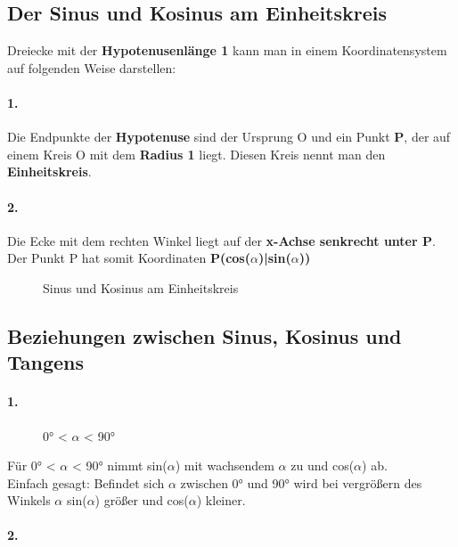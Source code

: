 \documentclass[12pt,a4paper]{article}
\begin{document}
\subsection{Der Sinus und Kosinus am Einheitskreis}
\noindent
Dreiecke mit der \textbf{Hypotenusenlänge 1} kann man in einem Koordinatensystem auf folgenden Weise darstellen:
\begin{multicols}{2}
\paragraph{1. }
Die Endpunkte der \textbf{Hypotenuse} sind der Ursprung O und ein Punkt \textbf{P}, der auf einem Kreis O mit dem \textbf{Radius 1} liegt. Diesen Kreis nennt man den \textbf{Einheitskreis}.
\paragraph{2. }
Die Ecke mit dem rechten Winkel liegt auf der \textbf{x-Achse senkrecht unter P}. Der Punkt P hat somit Koordinaten \textbf{P(cos($\alpha$)|sin($\alpha$))}
\end{multicols}
\begin{figure}[hb!]
	\centering
    \def\svgwidth{250px}
    
    \caption{Sinus und Kosinus am Einheitskreis}
  	\label{fig:sin_cos_einheitskreis}
\end{figure}
\newpage

\subsection{Beziehungen zwischen Sinus, Kosinus und Tangens}
\paragraph{1.} 
\begin{wrapfigure}[9]{r}{0.5\textwidth}
	\def\svgwidth{100px}
    
    \caption{0° < $\alpha$ < 90°}
  	\label{fig:sin_cos_einheitskreis}
\end{wrapfigure}
Für 0° < $\alpha$ < 90° nimmt sin($\alpha$) mit wachsendem $\alpha$ zu und cos($\alpha$) ab. \\
Einfach gesagt: Befindet sich $\alpha$ zwischen 0° und 90° wird bei vergrößern des Winkels $\alpha$ sin($\alpha$) größer und cos($\alpha$) kleiner.


\paragraph{2.}
\end{document}
